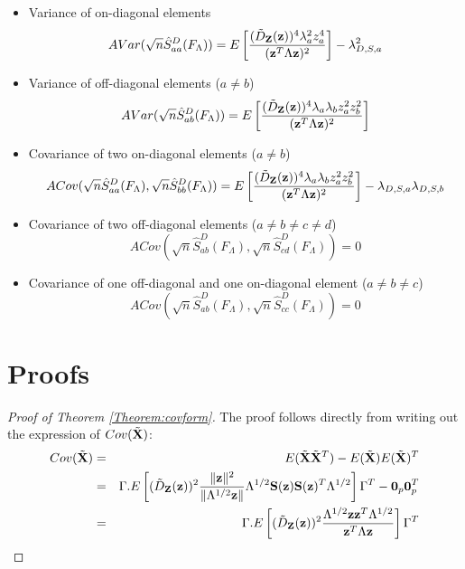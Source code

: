 \documentclass[fleqn,11pt]{article}
\begin{document}
\begin{itemize}
\item Variance of on-diagonal elements
%
$$ AVar( \sqrt n \hat S^D_{aa} (F_\Lambda)) = E \left[ \frac{(\tilde D_{\mathbf{Z}} ({\bf{z}}))^4 \lambda_a^2 z_a^4}{({\bf{z}}^T \Lambda {\bf{z}})^2} \right] - \lambda_{D,S,a}^2 $$

\item Variance of off-diagonal elements ($a \neq b$)
%
$$ AVar( \sqrt n \hat S^D_{ab} (F_\Lambda)) = E \left[ \frac{(\tilde D_{\mathbf{Z}} ({\bf{z}}))^4 \lambda_a \lambda_b z_a^2 z_b^2}{({\bf{z}}^T \Lambda {\bf{z}})^2} \right] $$

\item Covariance of two on-diagonal elements ($a \neq b$)
%
$$ ACov(\sqrt n \hat S^D_{aa} (F_\Lambda), \sqrt n \hat S^D_{bb} (F_\Lambda))
= E \left[ \frac{(\tilde D_{\mathbf{Z}} ({\bf{z}}))^4 \lambda_a \lambda_b z_a^2 z_b^2}{({\bf{z}}^T \Lambda {\bf{z}})^2} \right] - \lambda_{D,S,a} \lambda_{D,S,b} $$

\item Covariance of two off-diagonal elements ($a \neq b \neq c \neq d$)
%
$$ ACov(\sqrt n \hat S^D_{ab} (F_\Lambda), \sqrt n \hat S^D_{cd} (F_\Lambda)) = 0 $$

\item Covariance of one off-diagonal and one on-diagonal element ($a \neq b \neq c$)
%
$$ ACov(\sqrt n \hat S^D_{ab} (F_\Lambda), \sqrt n \hat S^D_{cc} (F_\Lambda)) = 0 $$
\end{itemize}

\section{Proofs}\label{section:appB}

\begin{proof}[Proof of Theorem  \ref{Theorem:covform}]
The proof follows directly from writing out the expression of $Cov ( \tilde {{\mathbf{X}}})$:
%
\begin{eqnarray*}
Cov(\tilde{{\mathbf{X}}}) &=& E(\tilde{{\mathbf{X}}} \tilde{{\mathbf{X}}}^T) - E(\tilde{{\mathbf{X}}}) E(\tilde{{\mathbf{X}}})^T\\
&=& \Gamma . E \left[ (\tilde D_{\mathbf{Z}}({\bf{z}}))^2 \frac{\|{\bf{z}}\|^2}{\| \Lambda^{1/2}{\bf{z}}\|} \Lambda^{1/2} {\mathbf{S}}({\bf{z}}) {\mathbf{S}}({\bf{z}})^T \Lambda^{1/2} \right] \Gamma^T - {\bf 0}_p {\bf 0}_p^T\\
&=& \Gamma .E \left[ (\tilde D_{\mathbf{Z}}({\bf{z}}))^2 \frac{\Lambda^{1/2} {\bf{z}} {\bf{z}}^T \Lambda^{1/2}}{{\bf{z}}^T \Lambda {\bf{z}}} \right] \Gamma^T
\end{eqnarray*}
%
\end{proof}
\end{document}
